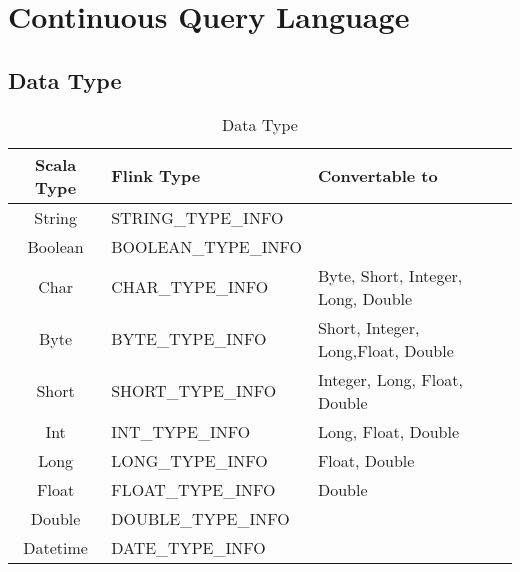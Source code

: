 \section{Continuous Query Language}


\subsection{Data Type}


\begin{table}[h]
\caption{Data Type}
\centering
\label{table:Data Type}
\setlength\extrarowheight{5pt}
\begin{tabular}{||c|l|l||}
\hline
\textbf{Scala Type} &  \textbf{Flink Type} & \textbf{Convertable to} \\ \hline\hline
                    String               &           STRING\_TYPE\_INFO                   &  \\ \hline
                    Boolean				&           BOOLEAN\_TYPE\_INFO                  &   \\ \hline
                   Char					&           CHAR\_TYPE\_INFO                       &  Byte, Short, Integer, Long, Double\\ \hline
					Byte		           	&           BYTE\_TYPE\_INFO                     & Short, Integer, Long,Float, Double \\ \hline
					Short				&           SHORT\_TYPE\_INFO                    & Integer, Long, Float, Double\\ \hline								
					Int					&           INT\_TYPE\_INFO                      & Long, Float, Double\\ \hline
					Long			 		&           LONG\_TYPE\_INFO                     & Float, Double \\ \hline								
					Float				&           FLOAT\_TYPE\_INFO                    & Double \\ \hline
					Double				&           DOUBLE\_TYPE\_INFO                   &   \\ \hline							
	Datetime				&           DATE\_TYPE\_INFO                &        	\\ \hline           							           							           							           							           
\end{tabular}
\end{table}



